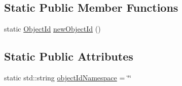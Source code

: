 \subsection*{Static Public Member Functions}
\begin{DoxyCompactItemize}
\item 
static \hyperlink{class_base_1_1_object_id}{Object\+Id} \hyperlink{class_base_1_1_object_id_a5ec6e05d2302d16274d66c815e43baf9}{new\+Object\+Id} ()
\end{DoxyCompactItemize}
\subsection*{Static Public Attributes}
\begin{DoxyCompactItemize}
\item 
static std\+::string \hyperlink{class_base_1_1_object_id_a8ccba80236842b454cf6e7dda04e12f5}{object\+Id\+Namespace} = \char`\"{}\char`\"{}
\end{DoxyCompactItemize}

